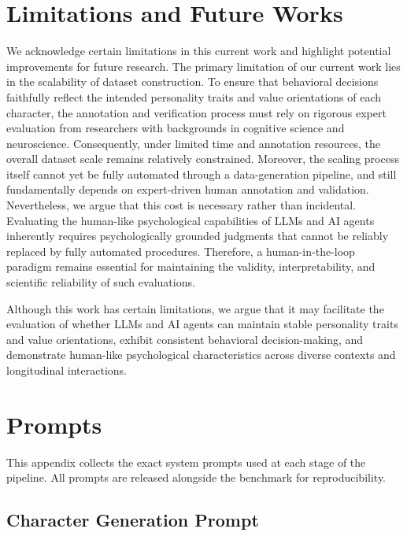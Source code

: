 \section{Limitations and Future Works}
\label{app:limitations}
We acknowledge certain limitations in this current work and highlight potential improvements for future research. The primary limitation of our current work lies in the scalability of dataset construction. To ensure that behavioral decisions faithfully reflect the intended personality traits and value orientations of each character, the annotation and verification process must rely on rigorous expert evaluation from researchers with backgrounds in cognitive science and neuroscience. Consequently, under limited time and annotation resources, the overall dataset scale remains relatively constrained. Moreover, the scaling process itself cannot yet be fully automated through a data-generation pipeline, and still fundamentally depends on expert-driven human annotation and validation. Nevertheless, we argue that this cost is necessary rather than incidental. Evaluating the human-like psychological capabilities of LLMs and AI agents inherently requires psychologically grounded judgments that cannot be reliably replaced by fully automated procedures. Therefore, a human-in-the-loop paradigm remains essential for maintaining the validity, interpretability, and scientific reliability of such evaluations.

Although this work has certain limitations, we argue that it may facilitate the evaluation of whether LLMs and AI agents can maintain stable personality traits and value orientations, exhibit consistent behavioral decision-making, and demonstrate human-like psychological characteristics across diverse contexts and longitudinal interactions.

\section{Prompts}
\label{app:prompts}

This appendix collects the exact system prompts used at each stage of the pipeline. All prompts are released alongside the benchmark for reproducibility.

\subsection{Character Generation Prompt}
\label{app:prompt_character}

